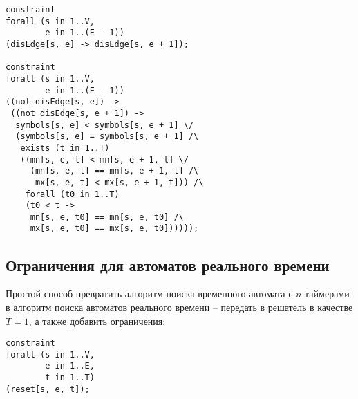 \documentclass[times,specification,annotation]{itmo-student-thesis}
\begin{document}
\begin{lstlisting}[float=!h,language=Mzn,caption={Ограничения на порядок переходов},label={bfs_3}]
constraint
forall (s in 1..V,
        e in 1..(E - 1))
(disEdge[s, e] -> disEdge[s, e + 1]);

constraint
forall (s in 1..V,
        e in 1..(E - 1))
((not disEdge[s, e]) -> 
 ((not disEdge[s, e + 1]) ->
  symbols[s, e] < symbols[s, e + 1] \/
  (symbols[s, e] = symbols[s, e + 1] /\
   exists (t in 1..T)
   ((mn[s, e, t] < mn[s, e + 1, t] \/
     (mn[s, e, t] == mn[s, e + 1, t] /\
      mx[s, e, t] < mx[s, e + 1, t])) /\
    forall (t0 in 1..T)
    (t0 < t ->
     mn[s, e, t0] == mn[s, e, t0] /\
     mx[s, e, t0] == mx[s, e, t0])))));
\end{lstlisting}


\subsection{Ограничения для автоматов реального времени}

Простой способ превратить алгоритм поиска временного автомата с $n$ таймерами в алгоритм поиска автоматов реального времени -- передать в решатель в качестве $T = 1$, а также добавить ограничения:

\begin{lstlisting}[float=!h,language=Mzn,caption={Ограничения RTA},label={rta_constraints}]
constraint
forall (s in 1..V,
        e in 1..E,
        t in 1..T)
(reset[s, e, t]);
\end{lstlisting}
\end{document}
